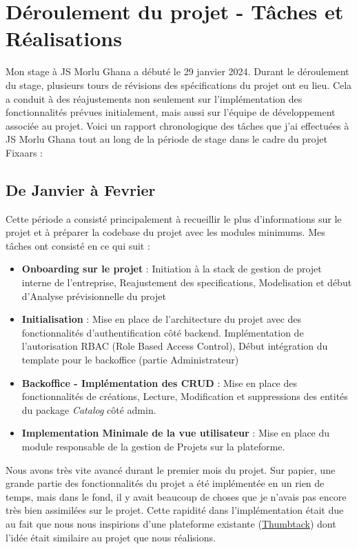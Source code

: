 \section{Déroulement du projet - Tâches et Réalisations}

Mon stage à JS Morlu Ghana a débuté le 29 janvier 2024. Durant le déroulement du stage, plusieurs tours de révisions des spécifications du projet ont eu lieu. Cela a conduit à des réajustements non seulement sur l'implémentation des fonctionnalités prévues initialement, mais aussi sur l'équipe de développement associée au projet. Voici un rapport chronologique des tâches que j'ai effectuées à JS Morlu Ghana tout au long de la période de stage dans le cadre du projet Fixaars :

\subsection*{De Janvier à Fevrier} 

Cette période a consisté principalement à recueillir le plus d'informations sur le projet et à préparer la codebase du projet avec les modules minimums. Mes tâches ont consisté en ce qui suit :\\ 

\begin{itemize}
    \item \textbf{Onboarding sur le projet} : Initiation à la stack de gestion de projet interne de l'entreprise, Reajustement des specifications, Modelisation et début d'Analyse prévisionnelle du projet
    \item \textbf{Initialisation} : Mise en place de l'architecture du projet avec des fonctionnalités d'authentification côté backend. Implémentation de l'autorisation RBAC (Role Based Access Control), Début intégration du template pour le backoffice (partie Administrateur)
    \item \textbf{ Backoffice - Implémentation des CRUD} : Mise en place des fonctionnalités de créations, Lecture, Modification et suppressions des entités du package \textit{Catalog} côté admin.
    \item \textbf{Implementation Minimale de la vue utilisateur} : Mise en place du module responsable de la gestion de Projets sur la plateforme.
\end{itemize}

\vspace{1cm}
Nous avons très vite avancé durant le premier mois du projet. Sur papier, une grande partie des fonctionnalités du projet a été implémentée en un rien de temps, mais dans le fond, il y avait beaucoup de choses que je n'avais pas encore très bien assimilées sur le projet. Cette rapidité dans l'implémentation était due au fait que nous nous inspirions d'une plateforme existante (\href{https://www.thumbtack.com/}{Thumbtack}) dont l'idée était similaire au projet que nous réalisions.

